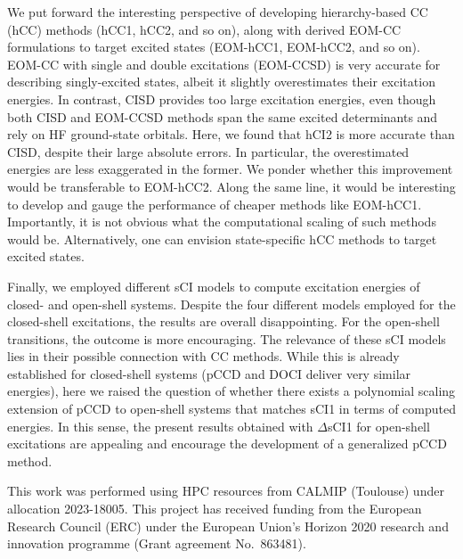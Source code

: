 \documentclass[aip,jcp,reprint,noshowkeys,superscriptaddress]{revtex4-1}
\begin{document}
We put forward the interesting perspective of developing hierarchy-based CC (hCC) methods (hCC1, hCC2, and so on),
along with derived EOM-CC formulations to target excited states (EOM-hCC1, EOM-hCC2, and so on).
EOM-CC with single and double excitations (EOM-CCSD) \cite{Rowe_1968,Monkhorst_1977,Koch_1990,Stanton_1993}
is very accurate for describing singly-excited states, \cite{Loos_2018,Loos_2020,Loos_2020a} albeit it slightly overestimates their excitation energies.
In contrast, CISD provides too large excitation energies, \cite{Koch_1990,Kossoski_2023}
even though both CISD and EOM-CCSD methods span the same excited determinants and rely on HF ground-state orbitals.
Here, we found that hCI2 is more accurate than CISD, despite their large absolute errors. In particular, the overestimated energies are less exaggerated in the former.
We ponder whether this improvement would be transferable to EOM-hCC2.
Along the same line, it would be interesting to develop and gauge the performance of cheaper methods like EOM-hCC1.
Importantly, it is not obvious what the computational scaling of such methods would be.
Alternatively, one can envision state-specific hCC methods to target excited states.

Finally, we employed different sCI models to compute excitation energies of closed- and open-shell systems.
Despite the four different models employed for the closed-shell excitations, the results are overall disappointing.
For the open-shell transitions, the outcome is more encouraging.
The relevance of these sCI models lies in their possible connection with CC methods.
While this is already established for closed-shell systems (pCCD and DOCI deliver very similar energies), \cite{Bytautas_2011,Allen_1962,Smith_1965,Veillard_1967,Kossoski_2021,Marie_2021}
here we raised the question of whether there exists a polynomial scaling extension of pCCD to open-shell systems that matches sCI1 in terms of computed energies.
In this sense, the present results obtained with $\Delta$sCI1 for open-shell excitations are appealing and encourage the development of a generalized pCCD method.

\begin{acknowledgements}
This work was performed using HPC resources from CALMIP (Toulouse) under allocation 2023-18005.
This project has received funding from the European Research Council (ERC) under the European Union's Horizon 2020 research and innovation programme (Grant agreement No.~863481).
\end{acknowledgements}
\end{document}
